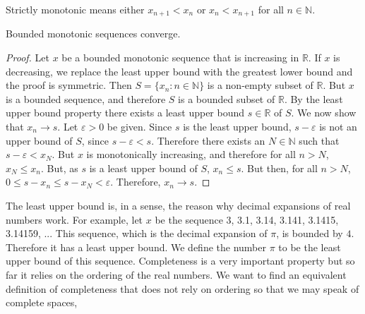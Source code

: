 \documentclass[crop=false,class=book,oneside]{standalone}
\begin{document}
            Strictly monotonic means either $x_{n+1}<x_{n}$
            or $x_{n}<x_{n+1}$ for all $n\in\mathbb{N}$.
            \begin{theorem}
                \label{th:funct:bounded_monotone_%
                       sequences_converge}
                Bounded monotonic sequences converge.
            \end{theorem}
            \begin{proof}
                Let $x$ be a bounded monotonic sequence that
                is increasing in $\mathbb{R}$.
                If $x$ is decreasing, we replace the least
                upper bound with the greatest lower
                bound and the proof is symmetric.
                Then $S=\{x_{n}:n\in\mathbb{N}\}$ is a
                non-empty subset of $\mathbb{R}$. But $x$ is
                a bounded sequence, and therefore $S$ is a
                bounded subset of $\mathbb{R}$. By the least
                upper bound property there exists a least
                upper bound $s\in\mathbb{R}$ of $S$.
                We now show that $x_{n}\rightarrow{s}$.
                Let $\varepsilon>0$ be given. Since $s$ is
                the least upper bound, $s-\varepsilon$
                is not an upper bound of $S$, since
                $s-\varepsilon<s$. Therefore there exists
                an $N\in\mathbb{N}$ such that
                $s-\varepsilon<x_{N}$. But $x$ is
                monotonically increasing, and therefore
                for all $n>N$, $x_{N}\leq{x_{n}}$.
                But, as $s$ is a least upper
                bound of $S$, $x_{n}\leq{s}$. But then,
                for all $n>N$,
                $0\leq{s-x_{n}}\leq{s-x_{N}}<\varepsilon$.
                Therefore, $x_{n}\rightarrow{s}$.
            \end{proof}
            The least upper bound is, in a sense, the
            reason why decimal expansions of
            real numbers work. For example, let $x$ be the
            sequence 3, 3.1, 3.14, 3.141, 3.1415, 3.14159, ...
            This sequence, which is the decimal
            expansion of $\pi$,
            is bounded by $4$. Therefore it has a least
            upper bound. We define the number $\pi$
            to be the least upper bound of this sequence.
            Completeness is a very important property
            but so far it relies on the ordering
            of the real numbers.
            We want to find an equivalent definition
            of completeness that does not rely on ordering
            so that we may speak of complete spaces,
\end{document}
